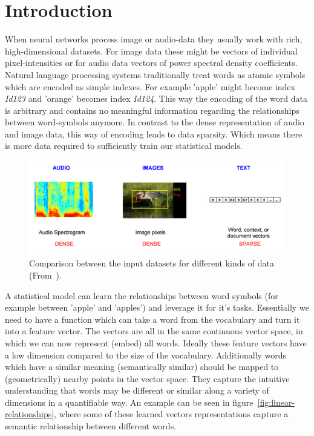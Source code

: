 \section{Introduction}
\label{sec:Introduction}


When neural networks process image or audio-data they usually work with rich, high-dimensional datasets.
For image data these might be vectors of individual pixel-intensities or for audio data vectors of power spectral density coefficients.
Natural language processing systems traditionally treat words as atomic symbols which are
encoded as simple indexes. For example 'apple' might become index \textit{Id123} and 'orange' becomes index \textit{Id124}. This way the
encoding of the word data is arbitrary and contains no meaningful information regarding the relationships between word-symbols anymore.
In contrast to the dense representation of audio and image data, this way of encoding leads to data sparsity. Which means there is more data
required to sufficiently train our statistical models.

\begin{figure}[H]
\begin{center}
  \includegraphics[width=\textwidth]{./img/audio-image-text}
  \caption{Comparison between the input datasets for different kinds of data (From~\cite{tensorflow:word2vec}).}
  \label{fig:audio-image-text}
\end{center}
\end{figure}

A statistical model can learn the relationships between word symbols (for example between 'apple' and 'apples') and leverage it for it's tasks.
Essentially we need to have a function which can take a word from the vocabulary and turn it into a feature vector.
The vectors are all in the same continuous vector space, in which we can now represent (embed) all words.
Ideally these feature vectors have a low dimension compared to the size of the vocabulary. Additionally words which have a
similar meaning (semantically similar) should be mapped to (geometrically) nearby points in the vector space.
They capture the intuitive understanding that words may be different 
or similar along a variety of dimensions in a quantifiable way.
An example can be seen in figure~\ref{fig:linear-relationships}, where some of these learned vectors representations
capture a semantic relationship between different words.

